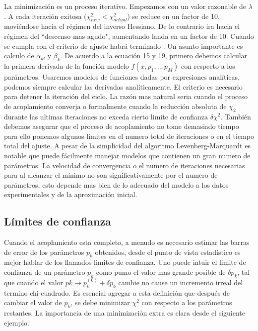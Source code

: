 \documentclass[a4paper,openright,12pt]{book}
\begin{document}
La minimización es un proceso iterativo. Empezamos con un valor razonable de $\lambda$. A cada iteración exitosa ($\chi_{new}^{2}<\chi_{actual}^{2}$) se reduce en un factor de 10, moviéndose hacia el régimen del inverso Hessiano. De lo contrario ira hacia el régimen del  ``descenso mas agudo", aumentando landa en un factor de 10. Cuando se cumpla con el criterio de ajuste habrá terminado .
Un asunto importante es calculo de $\alpha_{kl}$ y $\beta_{k}$. De acuerdo a la ecuación 15 y 19, primero debemos calcular la primera derivada de la función modelo $f(x,p_{1},..,p_{M})$ con respecto a los parámetros. Usaremos modelos de funciones dadas por expresiones analíticas, podemos siempre calcular las derivadas analíticamente.
El criterio es necesario para detener la iteración del ciclo. La razón mas natural seria cuando el proceso de acoplamiento converja o formalmente cuando la reducción absoluta de $\chi_{2}$ durante las ultimas iteraciones no exceda cierto limite de confianza $\delta\chi^{2}$. También debemos asegurar que el proceso de acoplamiento no tome demasiado tiempo para ello ponemos algunos limites en el numero total de iteraciones o en el tiempo total del ajuste. A pesar de la simplicidad del algoritmo Levenberg-Marquardt es notable que puede fácilmente manejar modelos que contienen un gran numero de parámetros. La velocidad de convergencia o el numero de iteraciones necesarias para al alcanzar el mínimo no son significativamente por el numero de parámetros, esto depende mas bien de lo adecuado del modelo a los datos experimentales y de  la aproximación inicial\cite{guide}.

\subsection{Límites de confianza}
Cuando el acoplamiento esta completo, a menudo es necesario estimar las barras de error de los parámetros $p_{k}$ obtenidos, desde el punto de vista estadístico es mejor hablar de los llamados limites de confianza. Uno puede intuir el limite de confianza de un parámetro $p_{k}$ como pumo el valor mas grande posible de $\delta p_{k}$, tal que cuando el valor $pk\rightarrow p_{k}^{(0)}+\delta p_{k}$ cambie no cause un incremento irreal del termino chi-cuadrado. Es esencial agregar a esta definición que después de cambiar el valor de $p_{k}$, se debe minimizar $\chi^{2}$ con respecto a los parámetros restantes. La importancia de una minimizaciòn extra es clara desde el siguiente ejemplo\cite{guide}.
\end{document}
